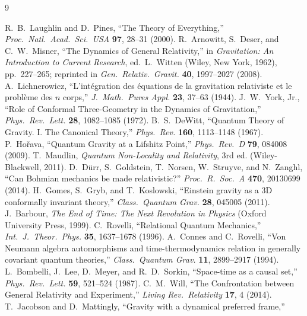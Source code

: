 \documentclass[11pt]{article}
\begin{document}
\begingroup\small
\begin{thebibliography}{9}
 R.~B.~Laughlin and D.~Pines, ``The Theory of Everything,''
  \emph{Proc.\ Natl.\ Acad.\ Sci.\ USA} \textbf{97}, 28--31 (2000).
 R.~Arnowitt, S.~Deser, and C.~W.~Misner, ``The Dynamics of General Relativity,'' in
  \emph{Gravitation: An Introduction to Current Research}, ed.\ L.~Witten (Wiley, New York, 1962),
  pp.~227--265; reprinted in \emph{Gen.\ Relativ.\ Gravit.} \textbf{40}, 1997--2027 (2008).
 A.~Lichnerowicz, ``L'int\'egration des \'equations de la gravitation relativiste
  et le probl\`eme des $n$ corps,'' \emph{J.\ Math.\ Pures Appl.} \textbf{23}, 37--63 (1944).
 J.~W.~York, Jr., ``Role of Conformal Three-Geometry in the Dynamics of Gravitation,''
  \emph{Phys.\ Rev.\ Lett.} \textbf{28}, 1082--1085 (1972).
 B.~S.~DeWitt, ``Quantum Theory of Gravity. I. The Canonical Theory,''
  \emph{Phys.\ Rev.} \textbf{160}, 1113--1148 (1967).
 P.~Ho\v{r}ava, ``Quantum Gravity at a Lifshitz Point,''
  \emph{Phys.\ Rev.\ D} \textbf{79}, 084008 (2009).
 T.~Maudlin, \emph{Quantum Non-Locality and Relativity}, 3rd ed.
  (Wiley-Blackwell, 2011).
 D.~D\"urr, S.~Goldstein, T.~Norsen, W.~Struyve, and N.~Zangh\`i, ``Can Bohmian
  mechanics be made relativistic?'' \emph{Proc.\ R.\ Soc.\ A} \textbf{470}, 20130699 (2014).
 H.~Gomes, S.~Gryb, and T.~Koslowski, ``Einstein gravity as a 3D
  conformally invariant theory,'' \emph{Class.\ Quantum Grav.} \textbf{28}, 045005 (2011).
 J.~Barbour, \emph{The End of Time: The Next Revolution in Physics}
  (Oxford University Press, 1999).
 C.~Rovelli, ``Relational Quantum Mechanics,''
  \emph{Int.\ J.\ Theor.\ Phys.} \textbf{35}, 1637--1678 (1996).
 A.~Connes and C.~Rovelli, ``Von Neumann algebra automorphisms and
  time-thermodynamics relation in generally covariant quantum theories,''
  \emph{Class.\ Quantum Grav.} \textbf{11}, 2899--2917 (1994).
 L.~Bombelli, J.~Lee, D.~Meyer, and R.~D.~Sorkin, ``Space-time as a causal set,''
  \emph{Phys.\ Rev.\ Lett.} \textbf{59}, 521--524 (1987).
 C.~M.~Will, ``The Confrontation between General Relativity and Experiment,''
  \emph{Living Rev.\ Relativity} \textbf{17}, 4 (2014).
 T.~Jacobson and D.~Mattingly, ``Gravity with a dynamical preferred frame,''

\end{thebibliography}
\end{document}
